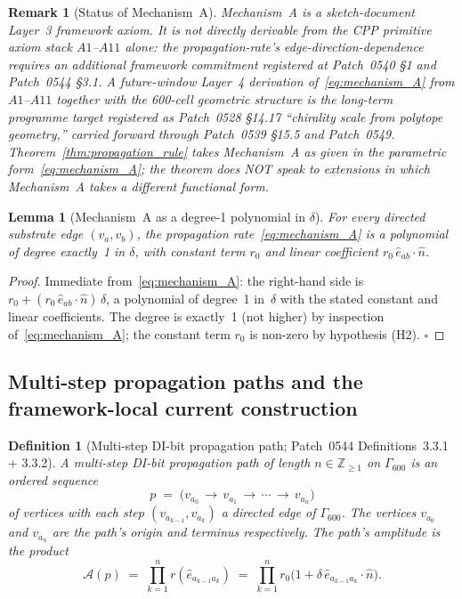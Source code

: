 \documentclass[11pt,letterpaper]{article}
\newtheorem{lemma}[theorem]{Lemma}
\newtheorem{definition}[theorem]{Definition}
\newtheorem{remark}[theorem]{Remark}
\newcommand{\nhat}{\hat{n}}
\newcommand{\Gsixcell}{\Gamma_{600}}
\begin{document}
\begin{remark}[Status of Mechanism~A]\label{rem:mechanism_A_status}
Mechanism~A is a sketch-document Layer~3 framework axiom. It is \emph{not} directly derivable from the CPP primitive axiom stack $A1$--$A11$ alone: the propagation-rate's edge-direction-dependence requires an additional framework commitment registered at Patch~0540 \S1 and Patch~0544 \S3.1. A future-window Layer~4 derivation of~\eqref{eq:mechanism_A} from $A1$--$A11$ together with the 600-cell geometric structure is the long-term programme target registered as Patch~0528 \S14.17 ``chirality scale from polytope geometry,'' carried forward through Patch~0539 \S15.5 and Patch~0549. Theorem~\ref{thm:propagation_rule} takes Mechanism~A as given in the parametric form~\eqref{eq:mechanism_A}; the theorem does NOT speak to extensions in which Mechanism~A takes a different functional form.
\end{remark}

\begin{lemma}[Mechanism~A as a degree-1 polynomial in $\delta$]\label{lem:mechanism_A_degree_one}
For every directed substrate edge $(v_a, v_b)$, the propagation rate~\eqref{eq:mechanism_A} is a polynomial of degree exactly~1 in $\delta$, with constant term $r_0$ and linear coefficient $r_0\,\hat{e}_{ab}\cdot\nhat$.
\end{lemma}
\begin{proof}
Immediate from~\eqref{eq:mechanism_A}: the right-hand side is $r_0 + (r_0\,\hat{e}_{ab}\cdot\nhat)\,\delta$, a polynomial of degree~1 in~$\delta$ with the stated constant and linear coefficients. The degree is exactly~1 (not higher) by inspection of~\eqref{eq:mechanism_A}; the constant term $r_0$ is non-zero by hypothesis (H2). $\square$
\end{proof}

\subsection{Multi-step propagation paths and the framework-local current construction}\label{sec:paths_and_current}

\begin{definition}[Multi-step DI-bit propagation path; Patch~0544 Definitions~3.3.1 + 3.3.2]\label{def:di_bit_path}
A multi-step DI-bit propagation path of length $n \in \mathbb{Z}_{\geq 1}$ on $\Gsixcell$ is an ordered sequence
\[
p \;=\; \bigl(v_{a_0} \,\to\, v_{a_1} \,\to\, \cdots \,\to\, v_{a_n}\bigr)
\]
of vertices with each step $(v_{a_{k-1}}, v_{a_k})$ a directed edge of $\Gsixcell$. The vertices $v_{a_0}$ and $v_{a_n}$ are the path's origin and terminus respectively. The path's amplitude is the product
\begin{equation}\label{eq:path_amplitude}
\mathcal{A}(p) \;=\; \prod_{k=1}^{n} r(\hat{e}_{a_{k-1} a_k}) \;=\; \prod_{k=1}^{n} r_0\bigl(1 + \delta\,\hat{e}_{a_{k-1} a_k}\cdot\nhat\bigr).
\end{equation}
\end{definition}
\end{document}
